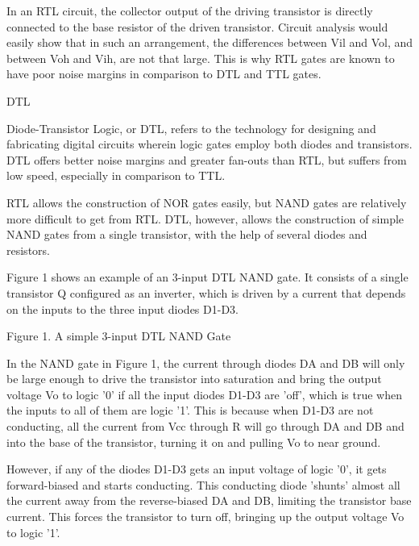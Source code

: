 In an RTL circuit, the collector output of the driving transistor is directly connected to the base resistor of the driven transistor.  Circuit analysis would easily show that in such an arrangement, the differences between Vil and Vol, and between Voh and Vih, are not that large.  This is why RTL gates are known to have poor noise margins in comparison to DTL and TTL gates.








DTL


Diode-Transistor Logic, or DTL, refers to the technology for designing and fabricating digital circuits wherein logic gates employ both diodes and transistors. DTL offers better noise margins and greater fan-outs than RTL, but suffers from low speed, especially in comparison to TTL.



RTL allows the construction of NOR gates easily, but NAND gates are relatively more difficult to get from RTL. DTL, however, allows the construction of simple NAND gates from a single transistor, with the help of several diodes and resistors.





Figure 1 shows an example of an 3-input DTL NAND gate.  It consists of a single transistor Q configured as an inverter, which is driven by a current that depends on the inputs to the three input diodes D1-D3.





Figure 1.  A simple 3-input DTL NAND Gate



In the NAND gate in Figure 1, the current through diodes DA and DB will only be large enough to drive the transistor into saturation and bring the output voltage Vo to logic '0' if all the input diodes D1-D3 are 'off', which is true when the inputs to all of them are logic '1'.  This is because when D1-D3 are not conducting, all the current from Vcc through R will go through DA and DB and into the base of the transistor, turning it on and pulling Vo to near ground.



However, if any of the diodes D1-D3 gets an input voltage of logic '0', it gets forward-biased and starts conducting. This conducting diode 'shunts' almost all the current away from the reverse-biased DA and DB, limiting the transistor base current.  This forces the transistor to turn off, bringing up the output voltage Vo to logic '1'.



